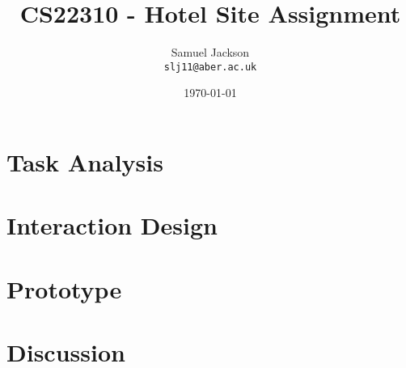 \documentclass{article}
\begin{document}
\title{CS22310 - Hotel Site Assignment}
\author{Samuel Jackson \\ \texttt{slj11@aber.ac.uk}}
\date{\today}
\maketitle

\section{Task Analysis}

\section{Interaction Design}

\section{Prototype}

\section{Discussion}
\end{document}
